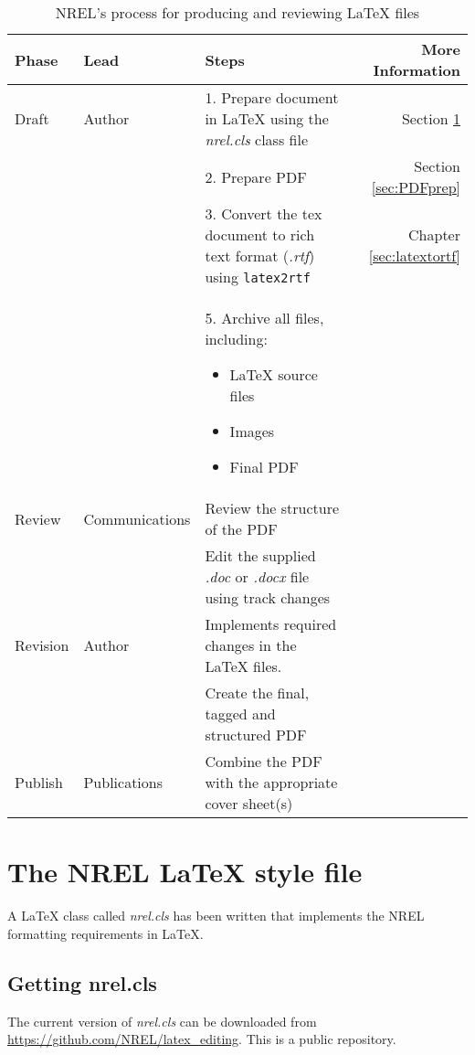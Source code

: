 \begin{table}[!h]
\centering
\caption{NREL's process for producing and reviewing LaTeX{} files}
\label{Tab:NRELprocess}
\begin{tabular*}{\textwidth}{llp{}r}
\toprule
Phase & Lead & Steps & More Information \\
\midrule
Draft & Author & 1. Prepare document in LaTeX using the \emph{nrel.cls} class file & Section \ref{sec:nrelcls} \\
 & & 2. Prepare PDF & Section \ref{sec:PDFprep} \\
 & & 3. Convert the tex document to rich text format (\emph{.rtf}) using \texttt{latex2rtf} & Chapter \ref{sec:latextortf}\\
 & & 5. Archive all files, including:
\begin{itemize}  
 \item LaTeX source files
 \item Images
 \item Final PDF 
 \end{itemize} & \\
Review & Communications & Review the structure of the PDF & \\
 & & Edit the supplied \emph{.doc} or \emph{.docx} file using track changes & \\
Revision & Author & Implements required changes in the LaTeX files. & \\
&  & Create the final, tagged and structured PDF \\
Publish & Publications & Combine the PDF with the appropriate cover sheet(s) & \\
\bottomrule
\end{tabular*}
\end{table}

\section{The NREL LaTeX style file}\label{sec:nrelcls}
A LaTeX class called \emph{nrel.cls} has been written that implements the NREL formatting requirements in LaTeX.

\subsection{Getting nrel.cls}
The current version of \emph{nrel.cls} can be downloaded from \href{https://github.com/NREL/latex_editing}{https://github.com/NREL/latex\_editing}. This is a public repository.

